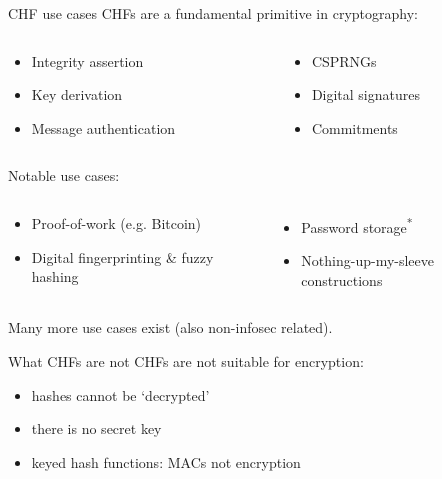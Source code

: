 \begin{frame}{CHF use cases}
  CHFs are a fundamental primitive in cryptography:
  \begin{columns}
    \begin{column}{0.4\textwidth}
      \begin{itemize}[<+(1)->]
        \item Integrity assertion
        \item Key derivation
        \item Message authentication
      \end{itemize}
    \end{column}
    \begin{column}{0.4\textwidth}
      \begin{itemize}[<+(1)->]
        \item CSPRNGs
        \item Digital signatures
        \item Commitments
      \end{itemize}
    \end{column}
  \end{columns}

  \vspace*{1.5em}
  \pause
  Notable use cases:
  \begin{columns}
    \begin{column}{0.4\textwidth}
      \begin{itemize}[<+(1)->]
        \item Proof-of-work (e.g. Bitcoin)
        \item Digital fingerprinting \& fuzzy hashing
      \end{itemize}
    \end{column}
    \begin{column}{0.4\textwidth}
      \begin{itemize}[<+(1)->]
        \item Password storage\textsuperscript{*}
        \item Nothing-up-my-sleeve constructions
      \end{itemize}
    \end{column}
  \end{columns}

  \vspace*{1.5em}
  \pause
  Many more use cases exist (also non-infosec related).
\end{frame}

\begin{frame}{What CHFs are not}
  CHFs are not suitable for encryption:
  \begin{itemize}[<+(1)->]
    \item hashes cannot be `decrypted'
    \item there is no secret key
    \item keyed hash functions: MACs not encryption
  \end{itemize}
\end{frame}

